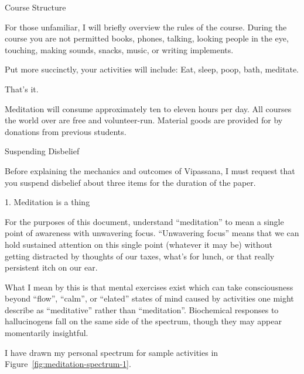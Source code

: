 \documentclass{article}
\begin{document}
\pagebreak

\begin{center}
  \Huge{Course Structure}
\end{center}

For those unfamiliar, I will briefly overview the rules of the course. During the course you are not permitted books, phones, talking, looking people in the eye, touching, making sounds, snacks, music, or writing implements.

Put more succinctly, your activities will include: Eat, sleep, poop, bath, meditate.

That's it.

Meditation will consume approximately ten to eleven hours per day. All courses the world over are free and volunteer-run. Material goods are provided for by donations from previous students.

\pagebreak

\begin{center}
  \Huge{Suspending Disbelief}
\end{center}

Before explaining the mechanics and outcomes of Vipassana, I must request that you suspend disbelief about three items for the duration of the paper.

\vspace{1cm}
\begin{center}
  \LARGE{1. Meditation is a thing}
\end{center}

For the purposes of this document, understand ``meditation'' to mean a single point of awareness with unwavering focus. ``Unwavering focus'' means that we can hold sustained attention on this single point (whatever it may be) without getting distracted by thoughts of our taxes, what's for lunch, or that really persistent itch on our ear.

What I mean by this is that mental exercises exist which can take consciousness beyond ``flow'', ``calm'', or ``elated'' states of mind caused by activities one might describe as ``meditative'' rather than ``meditation''. Biochemical responses to hallucinogens fall on the same side of the spectrum, though they may appear momentarily insightful.

I have drawn my personal spectrum for sample activities in Figure~\ref{fig:meditation-spectrum-1}.
\end{document}

